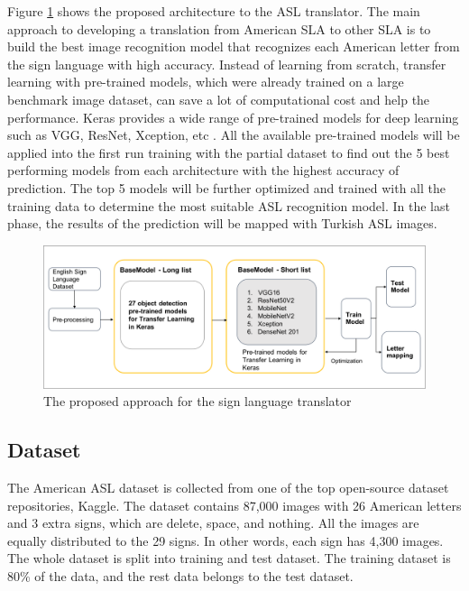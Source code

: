 Figure \ref{fig:the proposed approach} shows the proposed architecture to the ASL translator. The main approach to developing a translation from American SLA to other SLA is to build the best image recognition model that recognizes each American letter from the sign language with high accuracy. Instead of learning from scratch, transfer learning with pre-trained models, which were already trained on a large benchmark image dataset, can save a lot of computational cost and help the performance. Keras provides a wide range of pre-trained models for deep learning such as VGG, ResNet, Xception, etc \cite{keras}. All the available pre-trained models will be applied into the first run training with the partial dataset to find out the 5 best performing models from each architecture with the highest accuracy of prediction. The top 5 models will be further optimized and trained with all the training data to determine the most suitable ASL recognition model. In the last phase, the results of the prediction will be mapped with Turkish ASL images.

\begin{figure}[h]
    \centering
    \caption{The proposed approach for the sign language translator}
	\label{fig:the proposed approach}
    \includegraphics[width=\linewidth]{figures/The approach}
\end{figure}


\subsection{Dataset}
The American ASL dataset is collected from one of the top open-source dataset repositories, Kaggle. The dataset contains 87,000 images with 26 American letters and 3 extra signs, which are delete, space, and nothing. All the images are equally distributed to the 29 signs. In other words, each sign has 4,300 images. The whole dataset is split into training and test dataset. The training dataset is 80\% of the data, and the rest data belongs to the test dataset. 


